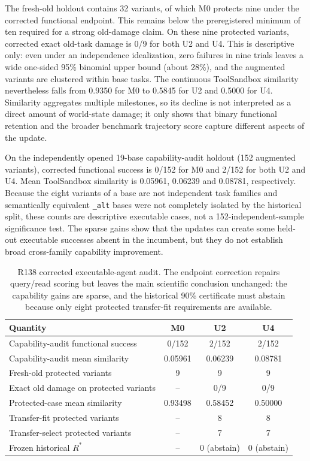\documentclass[11pt,letterpaper]{article}
\theoremstyle{plain}
\newcommand{\1}{\mathbf 1}
\begin{document}
The fresh-old holdout contains 32 variants, of which M0 protects nine under the corrected functional endpoint. This remains below the preregistered minimum of ten required for a strong old-damage claim. On these nine protected variants, corrected exact old-task damage is 0/9 for both U2 and U4. This is descriptive only: even under an independence idealization, zero failures in nine trials leaves a wide one-sided 95\% binomial upper bound (about 28\%), and the augmented variants are clustered within base tasks. The continuous ToolSandbox similarity nevertheless falls from 0.9350 for M0 to 0.5845 for U2 and 0.5000 for U4. Similarity aggregates multiple milestones, so its decline is not interpreted as a direct amount of world-state damage; it only shows that binary functional retention and the broader benchmark trajectory score capture different aspects of the update.

On the independently opened 19-base capability-audit holdout (152 augmented variants), corrected functional success is 0/152 for M0 and 2/152 for both U2 and U4. Mean ToolSandbox similarity is 0.05961, 0.06239 and 0.08781, respectively. Because the eight variants of a base are not independent task families and semantically equivalent \texttt{\_alt} bases were not completely isolated by the historical split, these counts are descriptive executable cases, not a 152-independent-sample significance test. The sparse gains show that the updates can create some held-out executable successes absent in the incumbent, but they do not establish broad cross-family capability improvement.

\begin{table}[H]
\centering
\caption{R138 corrected executable-agent audit. The endpoint correction repairs query/read scoring but leaves the main scientific conclusion unchanged: the capability gains are sparse, and the historical 90\% certificate must abstain because only eight protected transfer-fit requirements are available.}
\label{tab:s_r138_corrected}
\small
\begin{tabular}{lccc}
\toprule
Quantity & M0 & U2 & U4\\
\midrule
Capability-audit functional success & 0/152 & 2/152 & 2/152\\
Capability-audit mean similarity & 0.05961 & 0.06239 & 0.08781\\
Fresh-old protected variants & 9 & 9 & 9\\
Exact old damage on protected variants & -- & 0/9 & 0/9\\
Protected-case mean similarity & 0.93498 & 0.58452 & 0.50000\\
Transfer-fit protected variants & -- & 8 & 8\\
Transfer-select protected variants & -- & 7 & 7\\
Frozen historical $R^*$ & -- & 0 (abstain) & 0 (abstain)\\
\bottomrule
\end{tabular}
\end{table}
\end{document}
